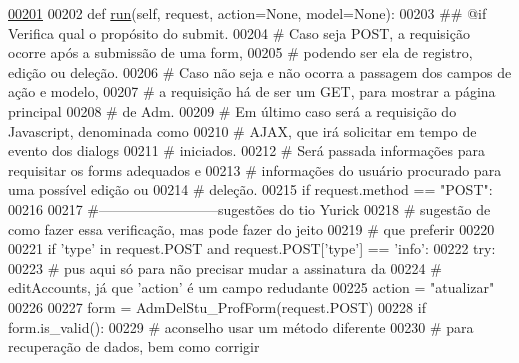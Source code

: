 \begin{DoxyCode}
\hypertarget{classAdm_1_1AdmUnit_1_1UiAdm_l00201}{}\hyperlink{classAdm_1_1AdmUnit_1_1UiAdm_a88df3b19b48d71b2c0fc0b4557c71416}{00201} 
00202     \textcolor{keyword}{def }\hyperlink{classAdm_1_1AdmUnit_1_1UiAdm_a88df3b19b48d71b2c0fc0b4557c71416}{run}(self, request, action=None, model=None):
00203         \textcolor{comment}{## @if Verifica qual o propósito do submit.
}
00204         \textcolor{comment}{#   Caso seja POST, a requisição ocorre após a submissão de uma form,
}
00205         \textcolor{comment}{#       podendo ser ela de registro, edição ou deleção.
}
00206         \textcolor{comment}{#   Caso não seja e não ocorra a passagem dos campos de ação e modelo,
}
00207         \textcolor{comment}{#       a requisição há de ser um GET, para mostrar a página principal
}
00208         \textcolor{comment}{#       de Adm.
}
00209         \textcolor{comment}{#   Em último caso será a requisição do Javascript, denominada como 
}
00210         \textcolor{comment}{#       AJAX, que irá solicitar em tempo de evento dos dialogs 
}
00211         \textcolor{comment}{#       iniciados.
}
00212         \textcolor{comment}{#   Será passada informações para requisitar os forms adequados e 
}
00213         \textcolor{comment}{#       informações do usuário procurado para uma possível edição ou 
}
00214         \textcolor{comment}{#       deleção.
}
00215         \textcolor{keywordflow}{if} request.method == \textcolor{stringliteral}{"POST"}:
00216 
00217             \textcolor{comment}{#--------------------------sugestões do tio Yurick
}
00218             \textcolor{comment}{# sugestão de como fazer essa verificação, mas pode fazer do jeito
}
00219             \textcolor{comment}{# que preferir
}
00220 
00221             \textcolor{keywordflow}{if} \textcolor{stringliteral}{'type'} \textcolor{keywordflow}{in} request.POST \textcolor{keywordflow}{and} request.POST[\textcolor{stringliteral}{'type'}] == \textcolor{stringliteral}{'info'}:
00222                 \textcolor{keywordflow}{try}:
00223                     \textcolor{comment}{# pus aqui só para não precisar mudar a assinatura da
}
00224                     \textcolor{comment}{# editAccounts, já que 'action' é um campo redudante
}
00225                     action = \textcolor{stringliteral}{"atualizar"}
00226 
00227                     form = AdmDelStu\_ProfForm(request.POST)
00228                     \textcolor{keywordflow}{if} form.is\_valid():
00229                         \textcolor{comment}{# aconselho usar um método diferente
}
00230                         \textcolor{comment}{# para recuperação de dados, bem como corrigir
}
\end{DoxyCode}
